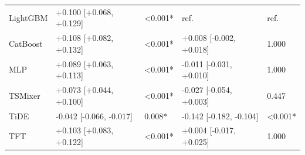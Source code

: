 \begin{longtable}{lllll}
LightGBM & +0.100 [+0.068, +0.129] & <0.001* & ref. & ref. \\
CatBoost & +0.108 [+0.082, +0.132] & <0.001* & +0.008 [-0.002, +0.018] & 1.000 \\
MLP & +0.089 [+0.063, +0.113] & <0.001* & -0.011 [-0.031, +0.010] & 1.000 \\
TSMixer & +0.073 [+0.044, +0.100] & <0.001* & -0.027 [-0.054, +0.003] & 0.447 \\
TiDE & -0.042 [-0.066, -0.017] & 0.008* & -0.142 [-0.182, -0.104] & <0.001* \\
TFT & +0.103 [+0.083, +0.122] & <0.001* & +0.004 [-0.017, +0.025] & 1.000 \\
\end{longtable}
